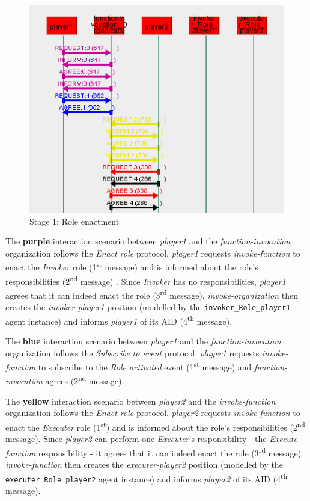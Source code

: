\begin{figure}[H]
	\centering
	\includegraphics[width=\textwidth]{images/example1-stage1.png}
	\caption{Stage 1: Role enactment}
	\label{figure:example1-stage1}
\end{figure}

The \textbf{purple} interaction scenario between \textit{player1} and the \textit{function-invocation} organization follows the \textit{Enact role} protocol.
\textit{player1} requests \textit{invoke-function} to enact the \textit{Invoker} role (1\textsuperscript{st} message) and is informed about the role's responsibilities (2\textsuperscript{nd} message) .
Since \textit{Invoker} has no responsibilities, \textit{player1} agrees that it can indeed enact the role (3\textsuperscript{rd} message).
\textit{invoke-organization} then creates the \textit{invoker-player1} position (modelled by the \texttt{invoker\_Role\_player1} agent instance) and informs \textit{player1} of its AID (4\textsuperscript{th} message).

The \textbf{blue} interaction scenario between \textit{player1} and the \textit{function-invocation} organization follows the \textit{Subscribe to event} protocol.
\textit{player1} requests \textit{invoke-function} to subscribe to the \textit{Role activated} event (1\textsuperscript{st} message) and \textit{function-invocation} agrees (2\textsuperscript{nd} message).

The \textbf{yellow} interaction scenario between \textit{player2} and the \textit{invoke-function} organization follows the \textit{Enact role} protocol.
\textit{player2} requests \textit{invoke-function} to enact the \textit{Executer} role (1\textsuperscript{st}) and is informed about the role's responsibilities (2\textsuperscript{nd} message).
Since \textit{player2} can perform one \textit{Executer}'s responsibility - the \textit{Execute function} responsibility - it agrees that it can indeed enact the role (3\textsuperscript{rd} message).
\textit{invoke-function} then creates the \textit{executer-player2} position (modelled by the \texttt{executer\_Role\_player2} agent instance) and informs \textit{player2} of its AID (4\textsuperscript{th} message).

